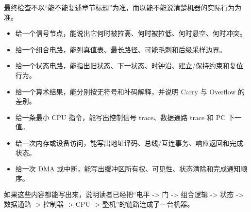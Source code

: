 \begin{classicnote}
最终检查不以“能不能复述章节标题”为准，而以能不能说清楚机器的实际行为为准。

\begin{itemize}
\item 给一个信号节点，能说出它何时被拉高、何时被拉低、何时悬空、何时冲突。
\item 给一个组合电路，能列真值表、最长路径、可能毛刺和后级采样边界。
\item 给一个状态电路，能指出旧状态、下一状态、时钟沿、建立/保持约束和复位行为。
\item 给一个算术结果，能分别按无符号和补码解释，并说明 Carry 与 Overflow 的差别。
\item 给一条最小 CPU 指令，能写出控制信号 trace、数据通路 trace 和 PC 下一值。
\item 给一次内存或设备访问，能写出地址译码、总线/互连事务、响应返回和完成状态。
\item 给一次 DMA 或中断，能写出缓冲区所有权、可见性、状态清除和完成通知顺序。
\end{itemize}

如果这些内容都能写出来，说明读者已经把“电平 -> 门 -> 组合逻辑 -> 状态 -> 数据通路 -> 控制器 -> CPU -> 整机”的链路连成了一台机器。
\end{classicnote}
